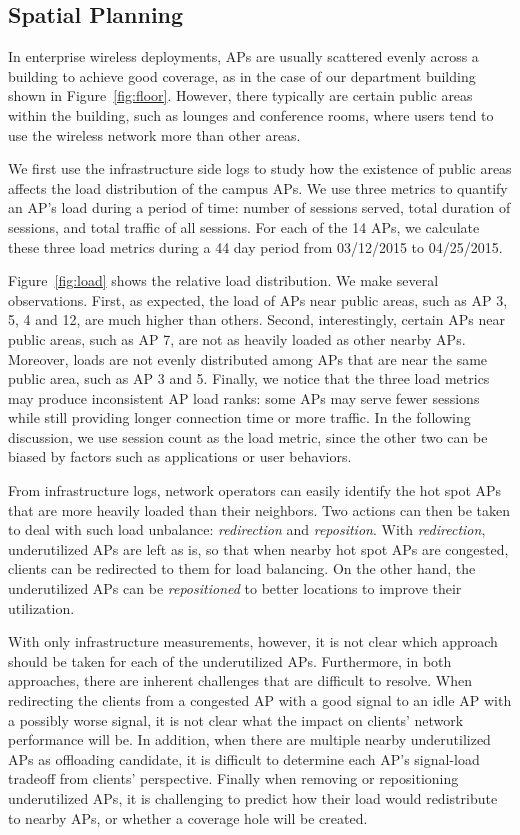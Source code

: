 \subsection{Spatial Planning}
\label{subsec:spatial}

In enterprise wireless deployments, APs are usually scattered evenly across a building
to achieve good coverage, as in the case of our department building shown in
Figure~\ref{fig:floor}. However, there typically are certain public areas within
the building, such as lounges and conference rooms, where users tend to use the
wireless network more than other areas.

We first use the infrastructure side logs to study how the existence of public
areas affects the load distribution of the campus APs. We use three metrics to
quantify an AP's load during a period of time: number of \wifi{} sessions
served, total duration of \wifi{} sessions, and total traffic of all sessions.
For each of the 14 APs, we calculate these three load metrics during a 44 day
period from 03/12/2015 to 04/25/2015.

Figure~\ref{fig:load} shows the relative load distribution. We make several
observations. First, as expected, the load of APs near public areas, such as AP
3, 5, 4 and 12, are much higher than others. Second, interestingly, certain APs
near public areas, such as AP 7, are not as heavily loaded as other nearby APs.
Moreover, loads are not evenly distributed among APs that are near the same
public area, such as AP 3 and 5. Finally, we notice that the three load metrics
may produce inconsistent AP load ranks: some APs may serve fewer \wifi{}
sessions while still providing longer connection time or more traffic. In the
following discussion, we use session count as the load metric, since the other
two can be biased by factors such as applications or user behaviors.

From infrastructure logs, network operators can easily identify the hot spot APs
that are more heavily loaded than their neighbors. Two actions can then be taken
to deal with such load unbalance: \textit{redirection} and \textit{reposition}.
With \textit{redirection}, underutilized APs are left as is, so that
when nearby hot spot APs are congested, clients can be redirected to them for
load balancing. On the other hand, the underutilized APs can be
\textit{repositioned} to better locations to improve their utilization.

With only infrastructure measurements, however, it is not clear which approach
should be taken for each of the underutilized APs. Furthermore, in both
approaches, there are inherent challenges that are difficult to resolve.  When
redirecting the clients from a congested AP with a good signal to an idle AP with
a possibly worse signal, it is not clear what the impact on clients' network
performance will be. In addition, when there are multiple nearby underutilized APs as
offloading candidate, it is difficult to determine each AP's signal-load
tradeoff from clients' perspective. Finally when removing or repositioning
underutilized APs, it is challenging to predict how their load would
redistribute to nearby APs, or whether a coverage hole will be created.

